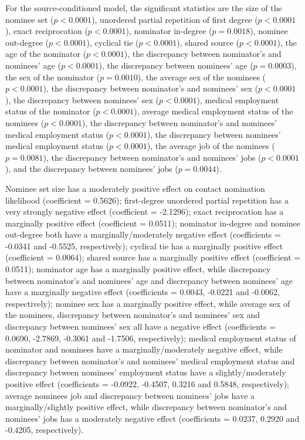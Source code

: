 For the source-conditioned model, the significant statistics are the size of the nominee set ($p<0.0001$), unordered partial repetition of first degree ($p<0.0001$), exact reciprocation ($p<0.0001$), nominator in-degree ($p=0.0018$), nominee out-degree ($p<0.0001$), cyclical tie ($p<0.0001$), shared source ($p<0.0001$), the age of the nominator ($p<0.0001$), the discrepancy between nominator's and nominees' age ($p<0.0001$), the discrepancy between nominees' age ($p=0.0003$), the sex of the nominator ($p=0.0010$), the average sex of the nominees ($p<0.0001$), the discrepancy between nominator's and nominees' sex ($p<0.0001$), the discrepancy between nominees' sex ($p<0.0001$), medical employment status of the nominator ($p<0.0001$), average medical employment status of the nominees ($p<0.0001$), the discrepancy between nominator's and nominees' medical employment status ($p<0.0001$), the discrepancy between nominees' medical employment status ($p<0.0001$), the average job of the nominees ($p=0.0081$), the discrepancy between nominator's and nominees' jobs ($p<0.0001$), and the discrepancy between nominees' jobs ($p=0.0044$). 

Nominee set size has a moderately positive effect on contact nomination likelihood (coefficient = 0.5626); first-degree unordered partial repetition has a very strongly negative effect (coefficient = -2.1296); exact reciprocation has a marginally positive effect (coefficient = 0.0511); nominator in-degree and nominee out-degree both have a marginally/moderately negative effect (coefficients = -0.0341 and -0.5525, respectively); cyclical tie has a marginally positive effect (coefficient = 0.0064); shared source has a marginally positive effect (coefficient = 0.0511); nominator age has a marginally positive effect, while discrepancy between nominator's and nominees' age and discrepancy between nominees' age have a marginally negative effect (coefficients = 0.0043, -0.0221 and -0.0062, respectively); nominee sex has a marginally positive effect, while average sex of the nominees, discrepancy between nominator's and nominees' sex and discrepancy between nominees' sex all have a negative effect (coefficients = 0.0690, -2.7869, -0.3061 and -1.7506, respectively); medical employment status of nominator and nominees have a marginally/moderately negative effect, while discrepancy between nominator's and nominees' medical employment status and discrepancy between nominees' employment status have a slightly/moderately positive effect (coefficients = -0.0922, -0.4507, 0.3216 and 0.5848, respectively); average nominees job and discrepancy between nominees' jobs have a marginally/slightly positive effect, while discrepancy between nominator's and nominees' jobs has a moderately negative effect (coefficients = 0.0237, 0.2920 and -0.4205, respectively).

